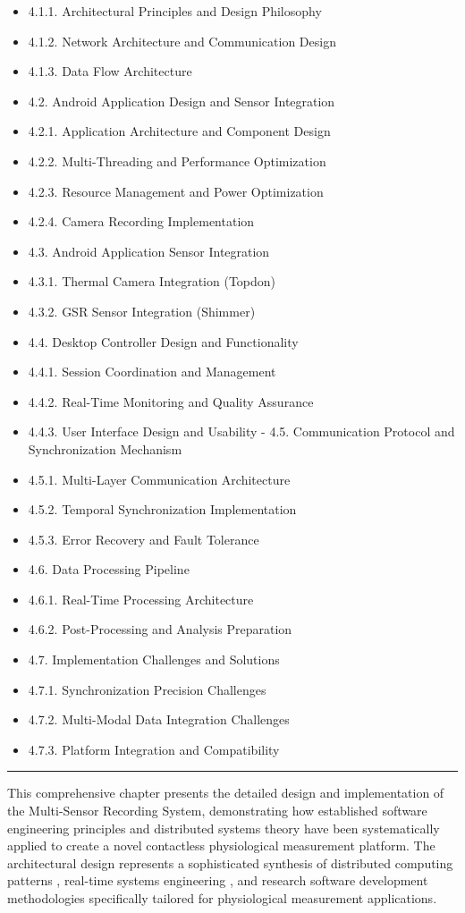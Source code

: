 \documentclass[11pt,a4paper]{article}
\begin{document}
\begin{itemize}
\item 4.1.1. Architectural Principles and Design Philosophy
\item 4.1.2. Network Architecture and Communication Design
\item 4.1.3. Data Flow Architecture
\item 4.2. Android Application Design and Sensor Integration
\item 4.2.1. Application Architecture and Component Design
\item 4.2.2. Multi-Threading and Performance Optimization
\item 4.2.3. Resource Management and Power Optimization
\item 4.2.4. Camera Recording Implementation
\item 4.3. Android Application Sensor Integration
\item 4.3.1. Thermal Camera Integration (Topdon)
\item 4.3.2. GSR Sensor Integration (Shimmer)
\item 4.4. Desktop Controller Design and Functionality
\item 4.4.1. Session Coordination and Management
\item 4.4.2. Real-Time Monitoring and Quality Assurance
\item 4.4.3. User Interface Design and Usability
    -
    4.5. Communication Protocol and Synchronization Mechanism
\item 4.5.1. Multi-Layer Communication Architecture
\item 4.5.2. Temporal Synchronization Implementation
\item 4.5.3. Error Recovery and Fault Tolerance
\item 4.6. Data Processing Pipeline
\item 4.6.1. Real-Time Processing Architecture
\item 4.6.2. Post-Processing and Analysis Preparation
\item 4.7. Implementation Challenges and Solutions
\item 4.7.1. Synchronization Precision Challenges
\item 4.7.2. Multi-Modal Data Integration Challenges
\item 4.7.3. Platform Integration and Compatibility

\end{itemize}
\hrule

This comprehensive chapter presents the detailed design and implementation of the Multi-Sensor Recording System,
demonstrating how established software engineering principles \cite{Martin2008, Fowler2018} and distributed systems
theory \cite{Tanenbaum2016, Coulouris2011} have been systematically applied to create a novel contactless physiological
measurement platform. The architectural design represents a sophisticated synthesis of distributed computing
patterns \cite{Gamma1994}, real-time systems engineering \cite{Liu2000}, and research software development
methodologies \cite{Wilson2014} specifically tailored for physiological measurement applications.
\end{document}
